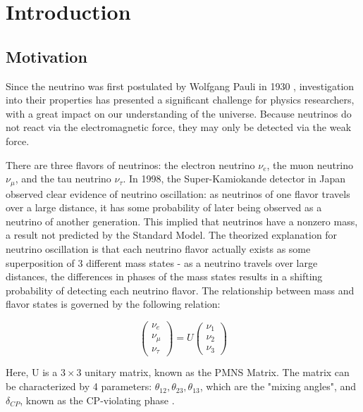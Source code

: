 
\chapter{Introduction}
\label{ch:Introduction}

\section{Motivation}

Since the neutrino was first postulated by Wolfgang Pauli in 1930 \cite{neutrinoHistory}, investigation into their properties has presented a significant challenge for physics researchers, with a great impact on our understanding of the universe.
Because neutrinos do not react via the electromagnetic force, they may only be detected via the weak force.

There are three flavors of neutrinos: the electron neutrino $\nu_e$, the muon neutrino $\nu_\mu$, and the tau neutrino $\nu_\tau$.
In 1998, the Super-Kamiokande detector in Japan observed clear evidence of neutrino oscillation: as neutrinos of one flavor travels over a large distance, it has some probability of later being observed as a neutrino of another generation.
This implied that neutrinos have a nonzero mass, a result not predicted by the Standard Model.
The theorized explanation for neutrino oscillation is that each neutrino flavor actually exists as some superposition of 3 different mass states - as a neutrino travels over large distances, the differences in phases of the mass states results in a shifting probability of detecting each neutrino flavor.
The relationship between mass and flavor states is governed by the following relation:

\[
\begin{pmatrix}
\nu_e \\ \nu_\mu \\ \nu_\tau
\end{pmatrix}
=
U \begin{pmatrix}
\nu_1 \\ \nu_2 \\ \nu_3
\end{pmatrix}
\]

Here, U is a $3 \times 3$ unitary matrix, known as the PMNS Matrix.
The matrix can be characterized by 4 parameters: $\theta_{12}, \theta_{23}, \theta_{13}$, which are the "mixing angles", and $\delta_{CP}$, known as the CP-violating phase \cite{pdg2018}. 

